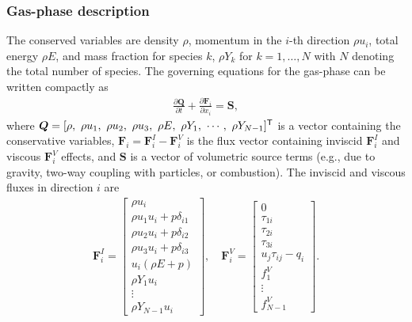 \documentclass[12pt]{article}
\newcommand{\tr}{{\sf T}} %
\begin{document}
\subsubsection{Gas-phase description \label{sec:gas}}
The conserved variables are density $\rho$, momentum in the $i$-th direction $\rho u_i$, total energy $\rho E$, and mass fraction for species $k$, $\rho Y_k$ for $k=1,\ldots,N$ with $N$ denoting the total number of species.
The governing equations for the gas-phase can be written compactly as
\begin{align}\label{eq:compact_N_S}
\frac{\partial \bm{Q}}{\partial t}+\frac{\partial \bm{F}_i}{\partial x_i}=\bm{S},
\end{align}
where $\bm{Q}=[\rho, \ \rho u_1, \ \rho u_2, \ \rho u_3, \ \rho E, \ \rho Y_1, \ \cdots, \  \rho Y_{N-1}]^\tr$ is a vector containing the conservative variables, $\bm{F}_i = \bm{F}^I_i - \textbf{F}^V_i$ is the flux vector containing inviscid $\bm{F}^I_i$ and viscous $\bm{F}^V_i$ effects, and $\bm{S}$ is a vector of volumetric source terms (e.g., due to gravity, two-way coupling with particles, or combustion). The inviscid and viscous fluxes in direction $i$ are
\begin{align}\label{F_S_1}
\bm{F}^I_i=\begin{bmatrix}
\rho u_i \\
\rho u_1 u_i + p \delta_{i1} \\
\rho u_2 u_i + p \delta_{i2} \\
\rho u_3 u_i + p \delta_{i3} \\
u_i(\rho E + p ) \\
\rho Y_1 u_i\\
\vdots\\
\rho Y_{N-1} u_i
\end{bmatrix},
\quad \bm{F}^V_i=\begin{bmatrix}
0 \\
\tau_{1i} \\
\tau_{2i} \\
\tau_{3i} \\
u_j \tau_{ij} - q_i \\
f^V_1\\
\vdots\\
f^V_{N-1}
\end{bmatrix}.
\end{align}
\end{document}
